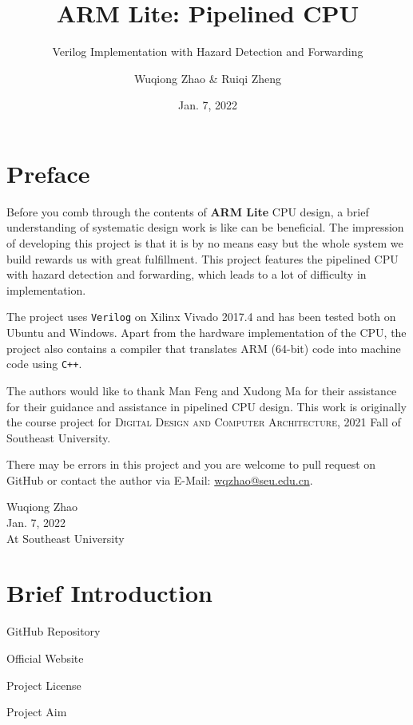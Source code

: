 \documentclass[11pt,fancy,bibstyle=ieee]{elegantbook}
\title{ARM Lite: Pipelined CPU}
\subtitle{Verilog Implementation with Hazard Detection and Forwarding}
\author{Wuqiong Zhao \& Ruiqi Zheng}
\institute{Southeast University}
\date{Jan. 7, 2022}
\begin{document}
\maketitle

\frontmatter
\tableofcontents

\chapter{Preface}

Before you comb through the contents of \textbf{ARM Lite} CPU design, a brief understanding of systematic design work is like can be beneficial.
The impression of developing this project is that it is by no means easy but the whole system we build rewards us with great fulfillment.
This project features the pipelined CPU with hazard detection and forwarding, which leads to a lot of difficulty in implementation.

The project uses \texttt{Verilog} on Xilinx Vivado 2017.4 and has been tested both on Ubuntu and Windows.
Apart from the hardware implementation of the CPU, the project also contains a compiler that translates ARM (64-bit) code into machine code using \texttt{C++}.

The authors would like to thank Man Feng and Xudong Ma for their assistance for their guidance and assistance in pipelined CPU design.
This work is originally the course project for \textsc{Digital Design and Computer Architecture}, 2021 Fall of Southeast University.

There may be errors in this project and you are welcome to pull request on GitHub or contact the author via E-Mail: \href{mailto:wqzhao@seu.edu.cn}{wqzhao@seu.edu.cn}.\\

\begin{flushright}
  \begin{minipage}{5cm}
    \centering
    {\sffamily\large Wuqiong Zhao} \\
    Jan. 7, 2022 \\
    At Southeast University
  \end{minipage}
\end{flushright}

\mainmatter

\chapter{Brief Introduction}

  \begin{introduction}
    \item GitHub Repository
    \item Official Website
    \item Project License
    \item Project Aim
  \end{introduction}
\end{document}
